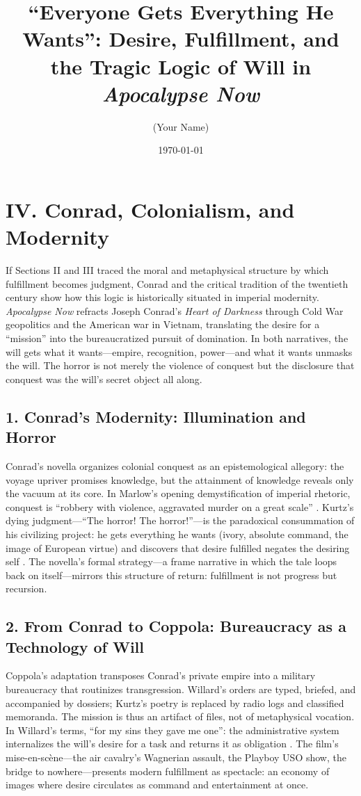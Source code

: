 \documentclass[12pt]{article}
\title{“Everyone Gets Everything He Wants”: Desire, Fulfillment, and the Tragic Logic of Will in \textit{Apocalypse Now}}
\author{(Your Name)}
\date{\today}
\begin{document}
\maketitle

\section*{IV. Conrad, Colonialism, and Modernity}

If Sections II and III traced the moral and metaphysical structure by which fulfillment becomes judgment, Conrad and the critical tradition of the twentieth century show how this logic is historically situated in imperial modernity. \textit{Apocalypse Now} refracts Joseph Conrad’s \textit{Heart of Darkness} through Cold War geopolitics and the American war in Vietnam, translating the desire for a ``mission'' into the bureaucratized pursuit of domination. In both narratives, the will gets what it wants---empire, recognition, power---and what it wants unmasks the will. The horror is not merely the violence of conquest but the disclosure that conquest was the will’s secret object all along.

\subsection*{1. Conrad’s Modernity: Illumination and Horror}
Conrad’s novella organizes colonial conquest as an epistemological allegory: the voyage upriver promises knowledge, but the attainment of knowledge reveals only the vacuum at its core. In Marlow’s opening demystification of imperial rhetoric, conquest is ``robbery with violence, aggravated murder on a great scale'' \parencite[ConradHOD1990]{ConradHOD1990}. Kurtz’s dying judgment---``The horror! The horror!''---is the paradoxical consummation of his civilizing project: he gets everything he wants (ivory, absolute command, the image of European virtue) and discovers that desire fulfilled negates the desiring self \parencite{ConradHOD1990}. The novella’s formal strategy---a frame narrative in which the tale loops back on itself---mirrors this structure of return: fulfillment is not progress but recursion.

\subsection*{2. From Conrad to Coppola: Bureaucracy as a Technology of Will}
Coppola’s adaptation transposes Conrad’s private empire into a military bureaucracy that routinizes transgression. Willard’s orders are typed, briefed, and accompanied by dossiers; Kurtz’s poetry is replaced by radio logs and classified memoranda. The mission is thus an artifact of files, not of metaphysical vocation. In Willard’s terms, ``for my sins they gave me one'': the administrative system internalizes the will’s desire for a task and returns it as obligation \parencite{CoppolaApocalypse1979}. The film’s mise-en-scène—the air cavalry’s Wagnerian assault, the Playboy USO show, the bridge to nowhere—presents modern fulfillment as spectacle: an economy of images where desire circulates as command and entertainment at once.
\end{document}
